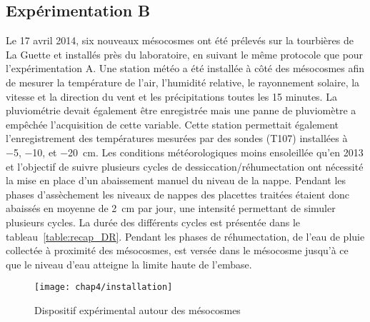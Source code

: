 \subsection{Expérimentation B}
Le 17 avril 2014, six nouveaux mésocosmes ont été prélevés sur la tourbières de La Guette et installés près du laboratoire, en suivant le même protocole que pour l'expérimentation A.
Une station météo a été installée à côté des mésocosmes afin de mesurer la température de l'air, l'humidité relative, le rayonnement solaire, la vitesse et la direction du vent et les précipitations toutes les 15 minutes.
La pluviométrie devait également être enregistrée mais une panne de pluviomètre a empêchée l'acquisition de cette variable.
Cette station permettait également l'enregistrement des températures mesurées par des sondes (T107) installées à \num{-5}, \num{-10}, et \SI{-20}{\centi\metre}.
Les conditions météorologiques moins ensoleillée qu'en 2013 et l'objectif de suivre plusieurs cycles de dessiccation/réhumectation ont nécessité la mise en place d'un abaissement manuel du niveau de la nappe.
Pendant les phases d'assèchement les niveaux de nappes des placettes traitées étaient donc abaissés en moyenne de \SI{2}{\centi\metre} par jour, une intensité permettant de simuler plusieurs cycles.
La durée des différents cycles est présentée dans le tableau~\ref{table:recap_DR}.
Pendant les phases de réhumectation, de l'eau de pluie collectée à proximité des mésocosmes, est versée dans le mésocosme jusqu'à ce que le niveau d'eau atteigne la limite haute de l'embase. 



\begin{figure}
\centering
\texttt{[image: chap4/installation]}
\caption{Dispositif expérimental autour des mésocosmes}
\label{fig:mesocarte}
\end{figure}

